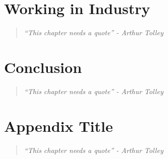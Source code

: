 \documentclass[12pt,twoside]{report} %
\newcommand{\chapterquote}[1]{
  \begin{quote}
    \color{mediumgray}\itshape #1
  \end{quote}
}
\begin{document}
\chapter[]{Working in Industry}
\chapterquote{``This chapter needs a quote'' - Arthur Tolley}


\chapter[]{Conclusion}
\chapterquote{``This chapter needs a quote'' - Arthur Tolley}


\appendix
\chapter[]{Appendix Title}
\chapterquote{``This chapter needs a quote'' - Arthur Tolley}




\end{document}
